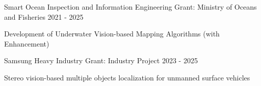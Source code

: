 \begin{cventries}
  \cventry
    {Smart Ocean Inspection and Information Engineering} %
    {Grant: Ministry of Oceans and Fisheries} %
    { } %
    {2021 - 2025} %
    {
      \begin{cvitems} %
        \item {Development of Underwater Vision-based Mapping Algorithms (with Enhancement)}
      \end{cvitems}
    }



  \cventry
    {Samsung Heavy Industry} %
    {Grant: Industry Project} %
    { } %
    {2023 - 2025} %
    {
      \begin{cvitems} %
        \item {Stereo vision-based multiple objects localization for unmanned surface vehicles}
      \end{cvitems}
    }




\end{cventries}
